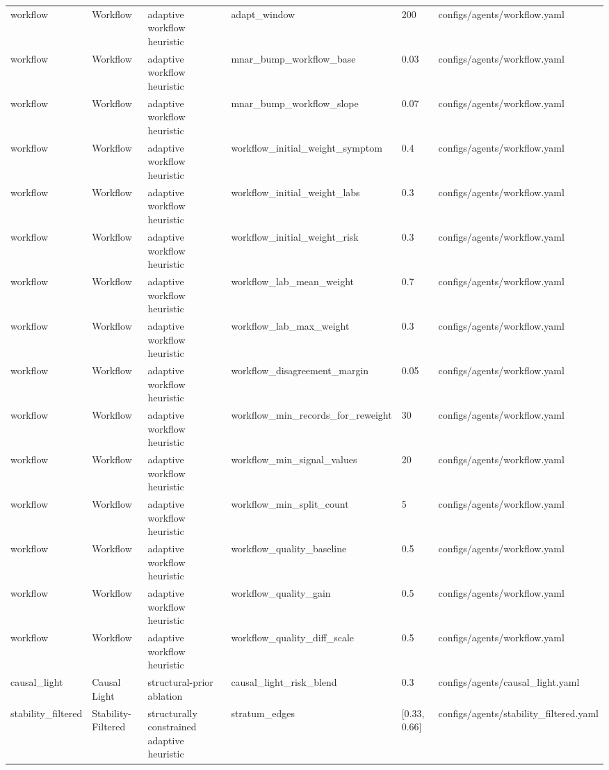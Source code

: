 \begin{tabular}{llllll}
workflow & Workflow & adaptive workflow heuristic & adapt\_window & 200 & configs/agents/workflow.yaml \\
workflow & Workflow & adaptive workflow heuristic & mnar\_bump\_workflow\_base & 0.03 & configs/agents/workflow.yaml \\
workflow & Workflow & adaptive workflow heuristic & mnar\_bump\_workflow\_slope & 0.07 & configs/agents/workflow.yaml \\
workflow & Workflow & adaptive workflow heuristic & workflow\_initial\_weight\_symptom & 0.4 & configs/agents/workflow.yaml \\
workflow & Workflow & adaptive workflow heuristic & workflow\_initial\_weight\_labs & 0.3 & configs/agents/workflow.yaml \\
workflow & Workflow & adaptive workflow heuristic & workflow\_initial\_weight\_risk & 0.3 & configs/agents/workflow.yaml \\
workflow & Workflow & adaptive workflow heuristic & workflow\_lab\_mean\_weight & 0.7 & configs/agents/workflow.yaml \\
workflow & Workflow & adaptive workflow heuristic & workflow\_lab\_max\_weight & 0.3 & configs/agents/workflow.yaml \\
workflow & Workflow & adaptive workflow heuristic & workflow\_disagreement\_margin & 0.05 & configs/agents/workflow.yaml \\
workflow & Workflow & adaptive workflow heuristic & workflow\_min\_records\_for\_reweight & 30 & configs/agents/workflow.yaml \\
workflow & Workflow & adaptive workflow heuristic & workflow\_min\_signal\_values & 20 & configs/agents/workflow.yaml \\
workflow & Workflow & adaptive workflow heuristic & workflow\_min\_split\_count & 5 & configs/agents/workflow.yaml \\
workflow & Workflow & adaptive workflow heuristic & workflow\_quality\_baseline & 0.5 & configs/agents/workflow.yaml \\
workflow & Workflow & adaptive workflow heuristic & workflow\_quality\_gain & 0.5 & configs/agents/workflow.yaml \\
workflow & Workflow & adaptive workflow heuristic & workflow\_quality\_diff\_scale & 0.5 & configs/agents/workflow.yaml \\
causal\_light & Causal Light & structural-prior ablation & causal\_light\_risk\_blend & 0.3 & configs/agents/causal\_light.yaml \\
stability\_filtered & Stability-Filtered & structurally constrained adaptive heuristic & stratum\_edges & [0.33, 0.66] & configs/agents/stability\_filtered.yaml \\

\end{tabular}
